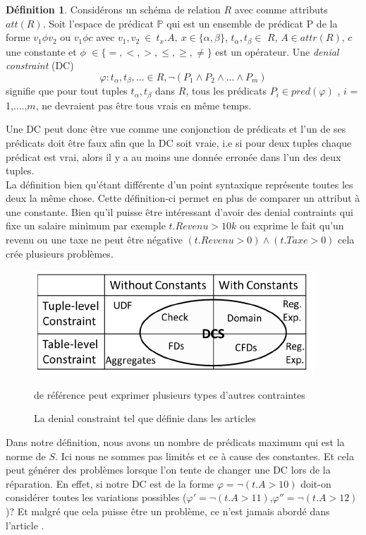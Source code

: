 \documentclass[letterpaper, 12pt]{report}
\theoremstyle{definition}
\newtheorem{mydef}{Définition}
\begin{document}
\begin{mydef}
	Considérons un schéma de relation $R$ avec comme attributs $att(R)$. Soit l'espace de prédicat $\mathbb{P}$ qui est un ensemble de prédicat P de la forme $v_1 \phi v_2$ ou $v_1 \phi c$ avec $v_1,v_2\ \in \ t_x.A,\ x \in \{\alpha,\beta \}$, $t_\alpha,t_\beta \in$ $R$, $A \in attr(R)$, $c$ une constante et $\phi$ $\in \{=,<,>,\leq,\geq,\neq \} $ est un opérateur. Une \emph{denial constraint} (DC)
	$$ \varphi : t_\alpha,t_\beta,... \in R,\neg(P_1 \wedge P_2 \wedge ... \wedge P_m)$$
	signifie que pour tout tuples $t_\alpha,t_\beta$ dans $R$, tous les prédicats $P_i \in pred (\varphi)$ , $i$ = 1,....,$m$, ne devraient pas être tous vrais en même temps. 
\end{mydef}

Une DC peut donc être vue comme une conjonction de prédicats et l'un de ses prédicats doit être faux afin que la DC soit vraie, i.e si pour deux tuples chaque prédicat est vrai, alors il y a au moins une donnée erronée dans l'un des deux tuples.\\

La définition bien qu'étant différente d'un point syntaxique représente toutes les deux la même chose. Cette définition-ci permet en plus de comparer un attribut à une constante. Bien qu'il puisse être intéressant d'avoir des denial contraints qui fixe un salaire minimum par exemple $t.Revenu > 10k$ ou exprime le fait qu'un revenu ou une taxe ne peut être négative $(t.Revenu >0) \wedge (t.Taxe >0)$ cela crée plusieurs problèmes.\\

\begin{figure}
	\centering
	\includegraphics[scale=1]{img/quadran.png}
	\caption{La denial constraint tel que définie dans les articles }de référence peut exprimer plusieurs types
	 d'autres contraintes \cite{DCs}
\end{figure}

Dans notre définition, nous avons un nombre de prédicats maximum qui est la norme de $S$. Ici nous ne sommes pas limités et ce à cause des constantes. Et cela peut générer des problèmes lorsque l'on tente de changer une DC lors de la réparation. En effet, si notre DC est de la forme $\varphi = \neg(t.A >10)$ doit-on considérer toutes les variations possibles ($\varphi' = \neg(t.A >11)$,$\varphi'' = \neg(t.A >12)$)? Et malgré que cela puisse être un problème, ce n'est jamais abordé dans l'article \cite{main}.\\
\end{document}
